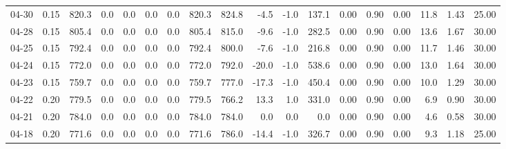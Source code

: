 \begin{threeparttable}
{\begin{tabular}{lrrrrrrrrrrrrrrrrr}
  04-30 &     0.15 & 820.3 &               0.0 &               0.0 &                0.0 &                0.0 & 820.3 & 824.8 &       -4.5 &                     -1.0 &               137.1 &       0.00 &      0.90 &           0.00 &             11.8 &            1.43 &                  25.00 \\
  04-28 &     0.15 & 805.4 &               0.0 &               0.0 &                0.0 &                0.0 & 805.4 & 815.0 &       -9.6 &                     -1.0 &               282.5 &       0.00 &      0.90 &           0.00 &             13.6 &            1.67 &                  30.00 \\
  04-25 &     0.15 & 792.4 &               0.0 &               0.0 &                0.0 &                0.0 & 792.4 & 800.0 &       -7.6 &                     -1.0 &               216.8 &       0.00 &      0.90 &           0.00 &             11.7 &            1.46 &                  30.00 \\
  04-24 &     0.15 & 772.0 &               0.0 &               0.0 &                0.0 &                0.0 & 772.0 & 792.0 &      -20.0 &                     -1.0 &               538.6 &       0.00 &      0.90 &           0.00 &             13.0 &            1.64 &                  30.00 \\
  04-23 &     0.15 & 759.7 &               0.0 &               0.0 &                0.0 &                0.0 & 759.7 & 777.0 &      -17.3 &                     -1.0 &               450.4 &       0.00 &      0.90 &           0.00 &             10.0 &            1.29 &                  30.00 \\
  04-22 &     0.20 & 779.5 &               0.0 &               0.0 &                0.0 &                0.0 & 779.5 & 766.2 &       13.3 &                      1.0 &               331.0 &       0.00 &      0.90 &           0.00 &              6.9 &            0.90 &                  30.00 \\
  04-21 &     0.20 & 784.0 &               0.0 &               0.0 &                0.0 &                0.0 & 784.0 & 784.0 &        0.0 &                      0.0 &                 0.0 &       0.00 &      0.90 &           0.00 &              4.6 &            0.58 &                  30.00 \\
  04-18 &     0.20 & 771.6 &               0.0 &               0.0 &                0.0 &                0.0 & 771.6 & 786.0 &      -14.4 &                     -1.0 &               326.7 &       0.00 &      0.90 &           0.00 &              9.3 &            1.18 &                  25.00 \\

\end{tabular}}
\end{threeparttable}
